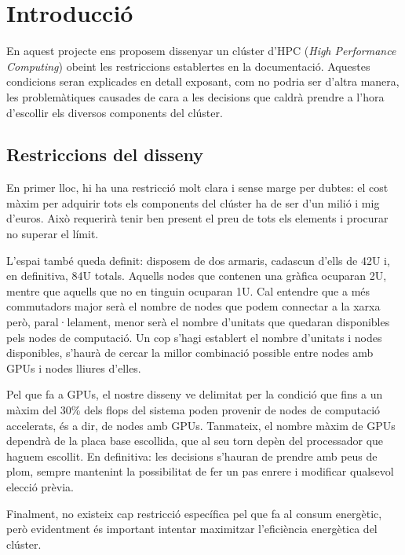 \section{Introducció}\label{sec:intro}

En aquest projecte ens proposem dissenyar un clúster d'HPC (\textit{High Performance Computing}) obeint les restriccions establertes en la documentació. Aquestes condicions seran explicades en detall exposant, com no podria ser d'altra manera, les problemàtiques causades de cara a les decisions que caldrà prendre a l'hora d'escollir els diversos components del clúster.

\subsection{Restriccions del disseny}
En primer lloc, hi ha una restricció molt clara i sense marge per dubtes: el cost màxim per adquirir tots els components del clúster ha de ser d'un milió i mig d'euros. Això requerirà tenir ben present el preu de tots els elements i procurar no superar el límit.

L'espai també queda definit: disposem de dos armaris, cadascun d'ells de 42U i, en definitiva, 84U totals. Aquells nodes que contenen una gràfica ocuparan 2U, mentre que aquells que no en tinguin ocuparan 1U. Cal entendre que a més commutadors major serà el nombre de nodes que podem connectar a la xarxa però, paral·lelament, menor serà el nombre d'unitats que quedaran disponibles pels nodes de computació. Un cop s'hagi establert el nombre d'unitats i nodes disponibles, s'haurà de cercar la millor combinació possible entre nodes amb GPUs i nodes lliures d'elles.

Pel que fa a GPUs, el nostre disseny ve delimitat per la condició que fins a un màxim del 30\% dels flops del sistema poden provenir de nodes de computació accelerats, és a dir, de nodes amb GPUs. Tanmateix, el nombre màxim de GPUs dependrà de la placa base escollida, que al seu torn depèn del processador que haguem escollit. En definitiva: les decisions s'hauran de prendre amb peus de plom, sempre mantenint la possibilitat de fer un pas enrere i modificar qualsevol elecció prèvia.

Finalment, no existeix cap restricció específica pel que fa al consum energètic, però evidentment és important intentar maximitzar l'eficiència energètica del clúster. 


